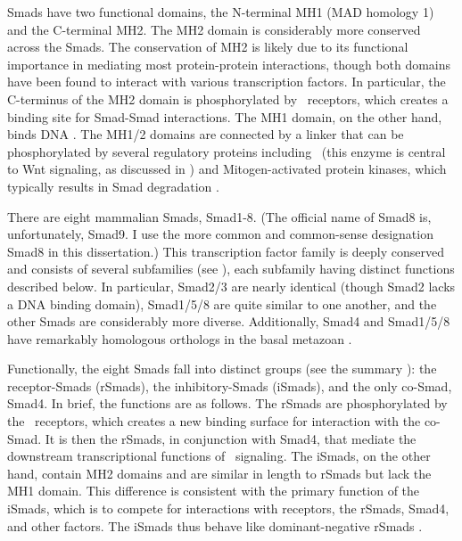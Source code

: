 Smads have two functional domains, the N-terminal MH1 (MAD homology 1) and the C-terminal
MH2. The MH2 domain is considerably more conserved
across the Smads. The conservation of MH2 is likely due to its
functional importance in mediating most protein-protein
interactions, though both domains have been found
to interact with various transcription factors. In particular, the C-terminus
of the MH2 domain is phosphorylated by \tgfbsf\ receptors, which creates
a binding site for Smad-Smad interactions. The MH1 domain,
on the other hand, binds DNA \cite{Derynck2003,Massague2005,Schmierer2007}.
The MH1/2 domains are connected by a linker that can be phosphorylated
by several regulatory proteins including \gsk\ (this enzyme is central
to Wnt signaling, as discussed in )
and Mitogen-activated protein kinases, which typically results in Smad degradation
\cite{Fuentealba2007,Guo2008}.



There are eight mammalian Smads, Smad1-8. (The official name of Smad8 is, 
unfortunately, Smad9. I use the more common and common-sense designation Smad8
in this dissertation.) This transcription factor family
is deeply conserved and consists of several subfamilies
(see ), each subfamily having distinct
functions described below. In particular, Smad2/3 are nearly identical
(though Smad2 lacks a DNA binding domain),
Smad1/5/8 are quite similar to one another,
and the other Smads are considerably more diverse. Additionally,
Smad4 and Smad1/5/8 have remarkably homologous orthologs in the basal
metazoan \ta.



Functionally, the eight Smads fall into distinct groups
(see the summary ): the receptor-Smads (rSmads),
the inhibitory-Smads (iSmads), and the only co-Smad, Smad4. In
brief, the functions are as follows. The rSmads are phosphorylated by the
\tgfbsf\ receptors, which creates a new binding surface for interaction with the
co-Smad. It is then the rSmads, in conjunction with Smad4, that mediate the
downstream transcriptional functions of \tgfbsf\ signaling. The iSmads, on the other hand,
contain MH2 domains and are similar in length to rSmads but lack the MH1 domain. This difference
is consistent with the primary function of the iSmads, which is to compete for interactions with
receptors, the rSmads, Smad4, and other factors. The iSmads thus behave like
dominant-negative rSmads \cite{Derynck2003}.


